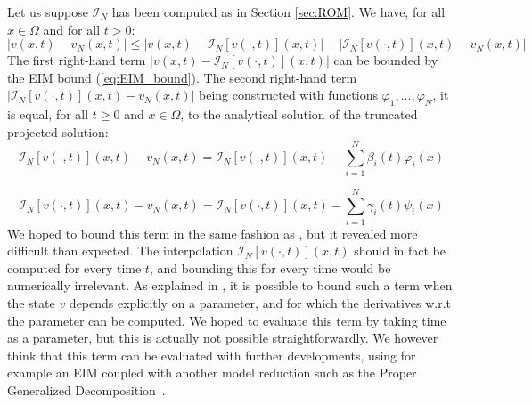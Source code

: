  
 
 



Let us suppose $\mathcal{I}_N $ has been computed as in Section \ref{sec:ROM}.
We have, for all $x \in \Omega$ and for all $t>0$:
\begin{equation}
 |v(x,t) - v_N(x,t) | \leq | v(x,t) - \mathcal{I}_N [v (\cdot,t)](x,t) | + |\mathcal{I}_N [v (\cdot,t)](x,t) - v_N(x,t) | 
\end{equation}
The first right-hand term $ | v(x,t) - \mathcal{I}_N [v (\cdot,t)](x,t) |$
can be bounded by the EIM bound (\ref{eq:EIM_bound}).
The second right-hand term $|\mathcal{I}_N [v (\cdot,t)](x,t) - v_N(x,t) |$ being
constructed with functions $\varphi_1,\dots,\varphi_N$,
it is equal, for all $t\geq0$ and $x \in \Omega$, to the analytical solution of the 
truncated projected solution:
$$\mathcal{I}_N [v (\cdot,t)] (x,t) - v_N(x,t) = \mathcal{I}_N [v (\cdot,t)](x,t) - \sum_{i=1}^N \beta_i(t) \varphi_i(x)$$

$$\mathcal{I}_N [v (\cdot,t)] (x,t) - v_N(x,t) = \mathcal{I}_N [v (\cdot,t)](x,t) - \sum_{i=1}^N \gamma_i(t) \psi_i(x)$$
We hoped to bound this term in the same fashion 
as \cite{eftang2010posteriori}, but it revealed more difficult than expected. 
The interpolation $\mathcal{I}_N [v (\cdot,t)](x,t)$ should in fact 
be computed for every time $t$, and bounding this 
for every time would be numerically irrelevant. 
As explained in \cite{eftang2010posteriori}, it is possible to bound such a
term when the state $v$ depends explicitly on a parameter, and for which 
the derivatives w.r.t the parameter can be computed. We hoped to evaluate this term by taking time
as a parameter, but this is actually not possible straightforwardly. We however
think that this term can be evaluated with further developments, using for example 
an EIM coupled with another model reduction such as the Proper Generalized 
Decomposition~\cite{chinesta2011short,chinesta2010recent}.

